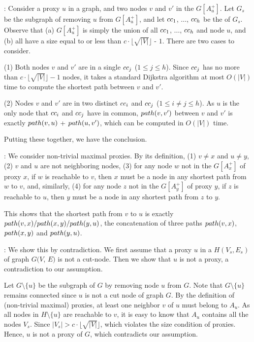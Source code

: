:
Consider a proxy $u$ in a graph, and two nodes $v$ and $v'$ in the \dra $G[A^+_u]$.
%
Let $G_s$ be the subgraph of removing $u$ from $G[A^+_u]$, and let ${\sc cc}_{1}$, $\ldots$, ${\sc cc}_{h}$ be the \ccs of $G_s$.
Observe that (a)  $G[A^+_{u}]$ is simply the union of all \ccs ${\sc cc}_{1}$, $\ldots$, ${\sc cc}_{h}$ and node $u$, and (b)
all \ccs have a size equal to or less than $c\cdot\lfloor\sqrt{|V|}\rfloor$ - $1$.  There are two cases to consider.

(1) Both nodes $v$ and $v'$ are in a single \cc ${\sc cc}_{j}$ ($1\le j\le h$).
Since \cc ${\sc cc}_{j}$ has no more than $c\cdot\lfloor\sqrt{|V|}\rfloor - 1$ nodes, it takes a standard Dijkstra algorithm at most $O(|V|)$ time to compute the shortest path between $v$ and $v'$.

(2) Nodes $v$ and $v'$ are in two distinct \ccs ${\sc cc}_{i}$ and ${\sc cc}_{j}$ ($1\le i\ne j\le h$).
As $u$ is the only node that ${\sc cc}_{i}$ and ${\sc cc}_{j}$ have in common, $\path(v,v')$ between $v$ and $v'$ is exactly $\path(v,u)$ + $\path(u,v')$, which can be computed in $O(|V|)$  time.

Putting these together, we have the conclusion.
\eop

:
We consider non-trivial maximal proxies. By its definition, (1) $v\neq x$ and $u\neq y$, (2) $v$ and $u$ are not neighboring nodes, (3)
for any node $w$ not in the \dra $G[A^+_{x}]$ of proxy $x$,  if $w$ is reachable to $v$, then $x$ must be a node in any shortest path from $w$ to $v$,
and, similarly, (4)  for any node $z$ not in the \dra $G[A^+_{y}]$ of proxy $y$,  if $z$ is reachable to $u$, then $y$ must be a node in any shortest path from $z$ to $y$.

This shows that the shortest path from $v$ to $u$ is exactly $\path(v, x)/\path(x, y)/\path(y, u)$, \ie the concatenation of three paths $\path(v, x)$, $\path(x, y)$ and $\path(y, u)$.
\eop


:
We show this by contradiction. We first assume that a proxy $u$ in a \cc $H(V_s, E_s)$ of graph $G(V$, $E)$ is not a cut-node.  Then we show that $u$ is not a proxy, a contradiction to our assumption.

Let $G\setminus\{u\}$ be the subgraph of $G$ by removing node $u$ from $G$.  Note that $G\setminus\{u\}$ remains connected since $u$ is not a cut node of graph $G$. By the definition of (non-trivial maximal) proxies, at least one neighbor $v$ of $u$ must belong to $A_{u}$.  As all nodes in $H\setminus\{u\}$ are reachable to $v$, it is easy to know that $A_{u}$ contains all the nodes $V_s$.  Since $|V_s| > c\cdot\lfloor\sqrt{|V|}\rfloor$, which violates the size condition of proxies. Hence, $u$ is not a proxy of $G$, which contradicts our assumption.
\eop


